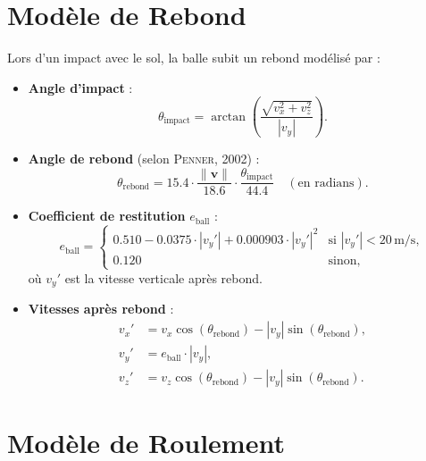 \documentclass[11pt, a4paper]{article}
\newcommand{\vb}[1]{\mathbf{#1}}       %
\begin{document}
\section{Modèle de Rebond}
\label{sec:bounce}

Lors d'un impact avec le sol, la balle subit un rebond modélisé par :
\begin{itemize}
    \item \textbf{Angle d'impact} :
    \begin{equation}
        \theta_\text{impact} = \arctan\left( \frac{\sqrt{v_x^2 + v_z^2}}{|v_y|} \right).
    \end{equation}
    \item \textbf{Angle de rebond} (selon \textsc{Penner, 2002}) :
    \begin{equation}
        \theta_\text{rebond} = 15.4 \cdot \frac{\|\vb{v}\|}{18.6} \cdot \frac{\theta_\text{impact}}{44.4} \quad (\text{en radians}).
    \end{equation}
    \item \textbf{Coefficient de restitution} $e_\text{ball}$ :
    \begin{equation}
        e_\text{ball} =
        \begin{cases}
            0.510 - 0.0375 \cdot |v_y'| + 0.000903 \cdot |v_y'|^2 & \text{si } |v_y'| < 20 \, \text{m/s}, \\
            0.120 & \text{sinon},
        \end{cases}
    \end{equation}
    où $v_y'$ est la vitesse verticale après rebond.
    \item \textbf{Vitesses après rebond} :
    \begin{equation}
        \begin{aligned}
            v_x' &= v_x \cos(\theta_\text{rebond}) - |v_y| \sin(\theta_\text{rebond}), \\
            v_y' &= e_\text{ball} \cdot |v_y|, \\
            v_z' &= v_z \cos(\theta_\text{rebond}) - |v_y| \sin(\theta_\text{rebond}).
        \end{aligned}
    \end{equation}
\end{itemize}


\section{Modèle de Roulement}
\label{sec:rolling}
\end{document}
